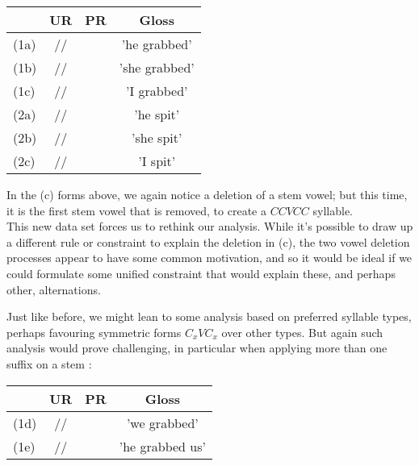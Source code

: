 \documentclass[11pt,draft]{article}
\begin{document}
\begin{table}[htdp]
\begin{tabularx}{400pt}{|l| C | C | C|}
	\hline
	&
	UR &
	PR &
	Gloss \\\hline\hline
	
	(1a) &
	// &
	 &
	'he grabbed' \\
	
	(1b) &
	// &
	 &
	'she grabbed' \\
	
	(1c) &
	// &
	 &
	'I grabbed' \\
	\hline
	
	(2a) &
	// &
	 &
	'he spit' \\
	
	(2b) &
	// &
	 &
	'she spit' \\
	
	(2c) &
	// &
	 &
	'I spit' \\
	\hline
	
\end{tabularx}
\end{table}

In the (c) forms above, we again notice a deletion of a stem vowel; but this time, it is the first stem vowel that is removed, to create a $CCVCC$ syllable.
\\

This new data set forces us to rethink our analysis.
While it's possible to draw up a different rule or constraint to explain the deletion in (c), the two vowel deletion processes appear to have some common motivation, and so it would be ideal if we could formulate some unified constraint that would explain these, and perhaps other, alternations.

\pagebreak

Just like before, we might lean to some analysis based on preferred syllable types, perhaps favouring symmetric forms $C_xVC_x$ over other types. But again such analysis would prove challenging, in particular when applying more than one suffix on a stem \cite{wolf2012}:

\begin{table}[htdp]
\begin{tabularx}{400pt}{|l| C | C | C|}
	\hline
	&
	UR &
	PR &
	Gloss \\\hline\hline
	
	(1d) &
	// &
	 &
	'we grabbed' \\
	
	(1e) &
	//  &
	 &
	'he grabbed us' \\
	\hline
	
\end{tabularx}
\end{table}
\end{document}
